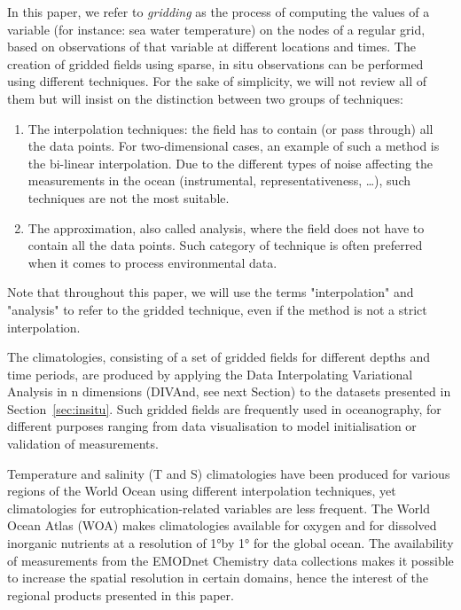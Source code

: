 \documentclass[essd, manuscript]{copernicus}
\begin{document}
In this paper, we refer to \textit{gridding} as the process of computing the values of a variable (for instance: sea water temperature) on the nodes of a regular grid, based on observations of that variable at different locations and times. The creation of gridded fields using sparse, in situ observations can be performed using different techniques. For the sake of simplicity, we will not review all of them but will insist on the distinction between two groups of techniques:
\begin{enumerate}
\item The interpolation techniques: the field has to contain (or pass through) all the data points. For two-dimensional cases, an example of such a method is the bi-linear interpolation. Due to the different types of noise affecting the measurements in the ocean (instrumental, representativeness, \ldots), such techniques are not the most suitable.
\item The approximation, also called analysis, where the field does not have to contain all the data points. Such category of technique is often preferred when it comes to process environmental data.
\end{enumerate}

Note that throughout this paper, we will use the terms "interpolation" and "analysis" to refer to the gridded technique, even if the method is not a strict interpolation.

The climatologies, consisting of a set of gridded fields for different depths and time periods, are produced by applying the Data Interpolating Variational Analysis in n dimensions (DIVAnd, see next Section) to the datasets presented in Section~\ref{sec:insitu}. Such gridded fields are frequently used in oceanography, for different purposes ranging from data visualisation to model initialisation or validation of measurements.  

Temperature and salinity (T and S) climatologies have been produced for various regions of the World Ocean using different interpolation techniques, yet climatologies for eutrophication-related variables are less frequent. The World Ocean Atlas (WOA) makes climatologies available for oxygen \citep[Dissolved Oxygen, Apparent Oxygen Utilization, and Oxygen Saturation,][]{Garcia2024} and for dissolved inorganic nutrients \citep[phosphate, nitrate and nitrate + nitrite, silicate,][]{Garcia2024b} at a resolution of 1°by 1° for the global ocean. The availability of measurements from the EMODnet Chemistry data collections makes it possible to increase the spatial resolution in certain domains, hence the interest of the regional products presented in this paper.
\end{document}
